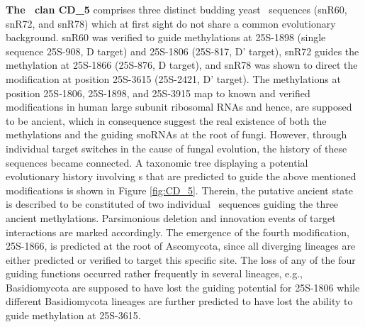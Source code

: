 \textbf{The \sno\ clan CD\_5} comprises three distinct budding yeast
\sno\ sequences (snR60, snR72, and snR78) which at first sight do not
share a common evolutionary background. snR60 was verified to guide
methylations at 25S-1898 (single sequence 25S-908, D target) and
25S-1806 (25S-817, D' target), snR72 guides the methylation at
25S-1866 (25S-876, D target), and snR78 was shown to direct the
modification at position 25S-3615 (25S-2421, D' target). The
methylations at position 25S-1806, 25S-1898, and 25S-3915 map to known
and verified modifications in human large subunit ribosomal RNAs and
hence, are supposed to be ancient, which in consequence suggest the
real existence of both the methylations and the guiding snoRNAs at the
root of fungi.  However, through individual target switches in the
cause of fungal evolution, the history of these sequences became
connected. A taxonomic tree displaying a potential evolutionary
history involving \sno s that are predicted to guide the above
mentioned modifications is shown in Figure \ref{fig:CD_5}. Therein,
the putative ancient state is described to be constituted of two
individual \sno\ sequences guiding the three ancient methylations.
Parsimonious deletion and innovation events of target interactions are
marked accordingly. The emergence of the fourth modification,
25S-1866, is predicted at the root of Ascomycota, since all diverging
lineages are either predicted or verified to target this specific
site. The loss of any of the four guiding functions occurred rather
frequently in several lineages, e.g., Basidiomycota are supposed to
have lost the guiding potential for 25S-1806 while different
Basidiomycota lineages are further predicted to have lost the ability
to guide methylation at 25S-3615.

